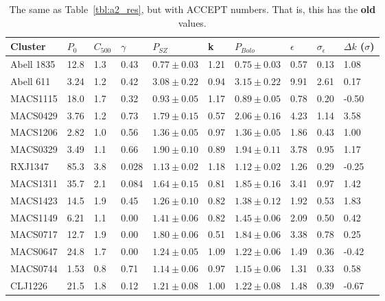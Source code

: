 \documentclass{article}
\begin{document}
\begin{table}
  \centering
  \begin{tabular}{l | l l l | l l l | l l l}
    Cluster & $P_0$ & $C_{500}$ & $\gamma$ & $P_{SZ}$ & k & $P_{Bolo}$ & $\epsilon$ & $\sigma_{\epsilon}$ & $\Delta k$ ($\sigma$) \\
    \hline   
    Abell 1835  & 12.8   & 1.3   & 0.43  & $0.77\pm0.03$ & 1.21 & $0.75\pm0.03$ & 0.57 & 0.13  & 1.08  \\
    Abell 611   & 3.24   & 1.2   & 0.42  & $3.08\pm0.22$ & 0.94 & $3.15\pm0.22$ & 9.91 & 2.61  & 0.17  \\
    MACS1115    & 18.0   & 1.7   & 0.32  & $0.93\pm0.05$ & 1.17 & $0.89\pm0.05$ & 0.78 & 0.20  & -0.50 \\
    MACS0429    & 3.76   & 1.2   & 0.73  & $1.79\pm0.15$ & 0.57 & $2.06\pm0.16$ & 4.23 & 1.14  & 3.58  \\
    MACS1206    & 2.82   & 1.0   & 0.56  & $1.36\pm0.05$ & 0.97 & $1.36\pm0.05$ & 1.86 & 0.43  & 1.00  \\
    MACS0329    & 3.49   & 1.1   & 0.66  & $1.90\pm0.10$ & 0.89 & $1.94\pm0.11$ & 3.78 & 0.95  & 1.17  \\
    RXJ1347     & 85.3   & 3.8   & 0.028 & $1.13\pm0.02$ & 1.18 & $1.12\pm0.02$ & 1.26 & 0.29  & -0.25 \\
    MACS1311    & 35.7   & 2.1   & 0.084 & $1.64\pm0.15$ & 0.81 & $1.85\pm0.16$ & 3.41 & 0.97  & 1.42  \\
    MACS1423    & 14.5   & 1.9   & 0.45  & $1.26\pm0.10$ & 0.82 & $1.38\pm0.12$ & 1.92 & 0.53  & 1.83  \\
    MACS1149    & 6.21   & 1.1   & 0.00  & $1.41\pm0.06$ & 0.82 & $1.45\pm0.06$ & 2.09 & 0.50  & 0.42  \\
    MACS0717    & 12.7   & 1.9   & 0.00  & $1.80\pm0.06$ & 0.51 & $1.84\pm0.06$ & 3.38 & 0.78  & 0.25  \\
    MACS0647    & 24.8   & 1.7   & 0.00  & $1.24\pm0.05$ & 1.09 & $1.22\pm0.06$ & 1.49 & 0.36  & -0.42 \\
    MACS0744    & 1.53   & 0.8   & 0.71  & $1.14\pm0.06$ & 0.97 & $1.15\pm0.06$ & 1.31 & 0.33  &  0.58 \\
    CLJ1226     & 21.5   & 1.8   & 0.12  & $1.21\pm0.08$ & 1.00 & $1.22\pm0.08$ & 1.48 & 0.39  & -0.67 
  \end{tabular}
  \caption{The same as Table~\ref{tbl:a2_res}, but with ACCEPT numbers. That is, this has the \textbf{old}
    values.}
\end{table}
\end{document}
